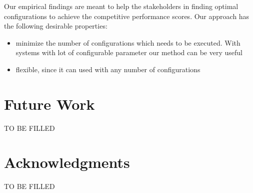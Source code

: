 \documentclass{sig-alternative}
\newcommand{\bi}{\begin{itemize}}%
\newcommand{\ei}{\end{itemize}}
\begin{document}
Our empirical findings are meant to help the stakeholders in finding optimal configurations to achieve the competitive performance scores. Our approach has the following desirable properties:
\bi
\item{minimize the number of configurations which needs to be executed. With systems with lot of configurable parameter our method can be very useful}
\item{flexible, since it can used with any number of configurations}
\ei




\section{Future Work}

TO BE FILLED
 
 

\section*{Acknowledgments}
TO BE FILLED
 
\vspace*{0.5mm}
 
 


\balance
  
\end{document}
